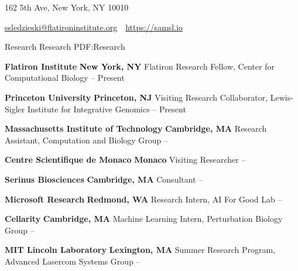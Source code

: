 \documentclass[letterpaper,MMMyyyy,nonstopmode]{simpleresumecv}
\newcommand{\CVAuthor}{Samuel Sledzieski}
\newcommand{\CVWebpage}{https://samsl.io}
\begin{document}
\Title{\CVAuthor}

\begin{SubTitle}
162 5th Ave, New York, NY 10010
\par
\href{mailto:ssledzieski@flatironinstitute.org}
{ssledzieski@flatironinstitute.org}
\,\SubBulletSymbol\,
\href{\CVWebpage}
{\url{\CVWebpage}}
\,\SubBulletSymbol\,
\end{SubTitle}

\begin{Body}

\Section
{Research}
{Research}
{PDF:Research}

\Entry
{\textbf{Flatiron Institute}}
\hfill \textbf{New York, NY}
\Gap
\Item Flatiron Research Fellow, Center for Computational Biology
\hfill
{} -- Present
\BigGap

\Entry
{\textbf{Princeton University}}
\hfill \textbf{Princeton, NJ}
\Gap
\Item Visiting Research Collaborator, Lewis-Sigler Institute for Integrative Genomics
\hfill
{} -- Present
\BigGap

\Entry
{\textbf{Massachusetts Institute of Technology}}
\hfill \textbf{Cambridge, MA}
\Gap
\Item Research Assistant, Computation and Biology Group
\hfill
{} -- 
\BigGap

\Entry
{\textbf{Centre Scientifique de Monaco}}
\hfill \textbf{Monaco}
\Gap
\Item Visiting Researcher
\hfill
{} -- 
\BigGap

\Entry
{\textbf{Serinus Biosciences}}
\hfill \textbf{Cambridge, MA}
\Gap
\Item Consultant
\hfill
{} -- 
\BigGap

\Entry
{\textbf{Microsoft Research}}
\hfill \textbf{Redmond, WA}
\Gap
\Item Research Intern, AI For Good Lab
\hfill
{} -- 
\BigGap

\Entry
{\textbf{Cellarity}}
\hfill \textbf{Cambridge, MA}
\Gap
\Item Machine Learning Intern, Perturbation Biology Group
\hfill
{} -- 
\BigGap

\Entry
{\textbf{MIT Lincoln Laboratory}}
\hfill \textbf{Lexington, MA}
\Gap
\Item Summer Research Program, Advanced Lasercom Systems Group
\hfill
{} --
\BigGap


\end{Body}
\end{document}
